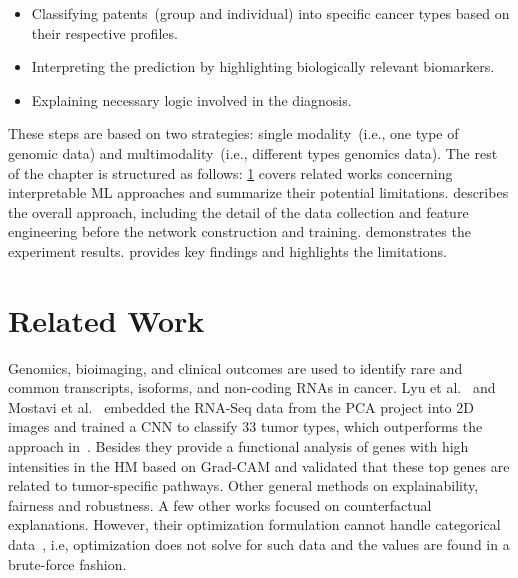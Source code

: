 \begin{itemize}[noitemsep]
\vspace{-2mm}
    \item Classifying patents~(group and individual) into specific cancer types based on their respective profiles.
    \item Interpreting the prediction by highlighting biologically relevant biomarkers.
    \item Explaining necessary logic involved in the diagnosis. 
    \vspace{-2mm}
\end{itemize}

\hspace*{3.5mm} These steps are based on two strategies: single modality~(i.e., one type of genomic data) and multimodality~(i.e., different types genomics data). 
The rest of the chapter is structured as follows: \cref{chapter_5:rw} covers related works concerning interpretable ML approaches and summarize their potential limitations.  describes the overall approach, including the detail of the data collection and feature engineering before the network construction and training.  demonstrates the experiment results.  provides key findings and highlights the limitations. %

\section{Related Work}\label{chapter_5:rw}
Genomics, bioimaging, and clinical outcomes are used to identify rare and common transcripts, isoforms, and non-coding RNAs in cancer. Lyu et al.~\cite{lyu2018deep} and Mostavi et al.~\cite{mostavi2019convolutional} embedded the RNA-Seq data from the PCA project into 2D images and trained a CNN to classify 33 tumor types, which outperforms the approach in~\cite{li2017comprehensive}. Besides they provide a functional analysis of genes with high intensities in the HM based on Grad-CAM and validated that these top genes are related to tumor-specific pathways. Other general methods on explainability, fairness and robustness. 
A few other works focused on counterfactual explanations. However, their optimization formulation cannot handle categorical data~\cite{ying2019gnnexplainer}, i.e, optimization does not solve for such data and the values are found in a brute-force fashion.

